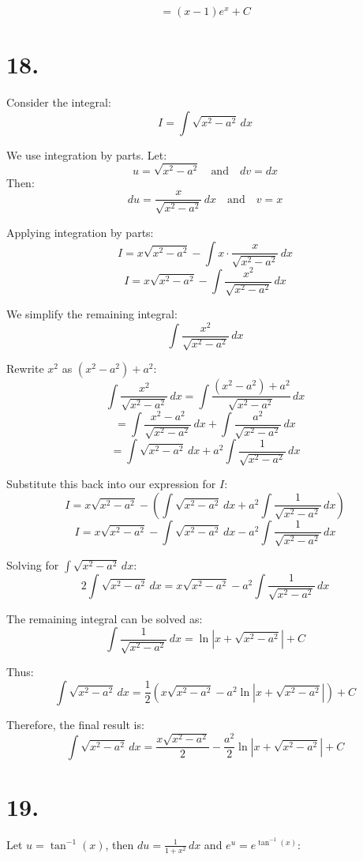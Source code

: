 \documentclass{article}
\begin{document}
\[
= (x - 1) e^x + C
\]


\section*{18.}

Consider the integral:
\[
I = \int \sqrt{x^2 - a^2} \, dx
\]

We use integration by parts. Let:
\[
u = \sqrt{x^2 - a^2} \quad \text{and} \quad dv = dx
\]
Then:
\[
du = \frac{x}{\sqrt{x^2 - a^2}} \, dx \quad \text{and} \quad v = x
\]

Applying integration by parts:
\[
I = x \sqrt{x^2 - a^2} - \int x \cdot \frac{x}{\sqrt{x^2 - a^2}} \, dx
\]
\[
I = x \sqrt{x^2 - a^2} - \int \frac{x^2}{\sqrt{x^2 - a^2}} \, dx
\]

We simplify the remaining integral:
\[
\int \frac{x^2}{\sqrt{x^2 - a^2}} \, dx
\]

Rewrite \(x^2\) as \( (x^2 - a^2) + a^2 \):
\[
\int \frac{x^2}{\sqrt{x^2 - a^2}} \, dx = \int \frac{(x^2 - a^2) + a^2}{\sqrt{x^2 - a^2}} \, dx
\]
\[
= \int \frac{x^2 - a^2}{\sqrt{x^2 - a^2}} \, dx + \int \frac{a^2}{\sqrt{x^2 - a^2}} \, dx
\]
\[
= \int \sqrt{x^2 - a^2} \, dx + a^2 \int \frac{1}{\sqrt{x^2 - a^2}} \, dx
\]

Substitute this back into our expression for \(I\):
\[
I = x \sqrt{x^2 - a^2} - \left( \int \sqrt{x^2 - a^2} \, dx + a^2 \int \frac{1}{\sqrt{x^2 - a^2}} \, dx \right)
\]
\[
I = x \sqrt{x^2 - a^2} - \int \sqrt{x^2 - a^2} \, dx - a^2 \int \frac{1}{\sqrt{x^2 - a^2}} \, dx
\]

Solving for \( \int \sqrt{x^2 - a^2} \, dx \):
\[
2 \int \sqrt{x^2 - a^2} \, dx = x \sqrt{x^2 - a^2} - a^2 \int \frac{1}{\sqrt{x^2 - a^2}} \, dx
\]

The remaining integral can be solved as:
\[
\int \frac{1}{\sqrt{x^2 - a^2}} \, dx = \ln \left| x + \sqrt{x^2 - a^2} \right| + C
\]

Thus:
\[
\int \sqrt{x^2 - a^2} \, dx = \frac{1}{2} \left( x \sqrt{x^2 - a^2} - a^2 \ln \left| x + \sqrt{x^2 - a^2} \right| \right) + C
\]

Therefore, the final result is:
\[
\int \sqrt{x^2 - a^2} \, dx = \frac{x \sqrt{x^2 - a^2}}{2} - \frac{a^2}{2} \ln \left| x + \sqrt{x^2 - a^2} \right| + C
\]

\section*{19.}

Let \( u = \tan^{-1}(x) \), then \( du = \frac{1}{1 + x^2} \, dx \) and \( e^u = e^{\tan^{-1}(x)} \):
\end{document}
